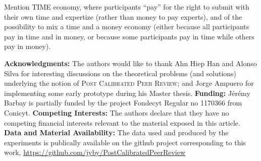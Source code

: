\documentclass[usletter]{llncs}
\begin{document}
\begin{TODO}
Mention TIME economy, where participants ``pay'' for the right to submit with their own time and expertize (rather than money to pay experts), and of the possibility to mix a time and a money economy (either because all participants pay in time and in money, or because some participants pay in time while others pay in money).
\end{TODO}

\medskip 
\textbf{Acknowledgments:} The authors would like to thank 
%
Ahn Hiep Han and Alonso Silva for interesting discussions on the theoretical problems (and solutions) underlying the notion of \textsc{Post Calibrated Peer Review}; and
%
Jorge Ampuero for implementing some early prototype during his Master thesis.
% 
\textbf{Funding:} J\'er\'emy Barbay is partially funded by 
the project Fondecyt Regular no 1170366 from Conicyt.
%
%
\textbf{Competing Interests:} The authors declare that they have no competing financial interests relevant to the material exposed in this article.
%
\textbf{Data and Material Availability:}
%
The data used and produced by the experiments is publically available on the github project corresponding to this work, \url{https://github.com/jyby/PostCalibratedPeerReview}


\end{document}
